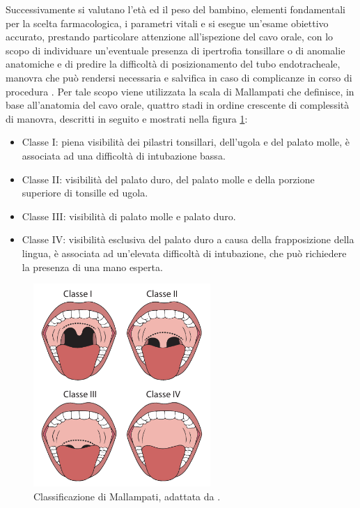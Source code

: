 Successivamente si valutano l'età ed il peso del bambino, elementi fondamentali per la scelta farmacologica, i parametri vitali e si esegue un'esame obiettivo accurato, prestando particolare attenzione all'ispezione del cavo orale, con lo scopo di individuare un'eventuale presenza di ipertrofia tonsillare o di anomalie anatomiche e di predire la difficoltà di posizionamento del tubo endotracheale, manovra che può rendersi necessaria e salvifica in caso di complicanze in corso di procedura \cite{Guidelines2019}. Per tale scopo viene utilizzata la scala di Mallampati che definisce, in base all'anatomia del cavo orale, quattro stadi in ordine crescente di complessità di manovra, descritti in seguito e mostrati nella figura \ref{fig:mallampati}:

\begin{itemize}
    \item Classe I: piena visibilità dei pilastri tonsillari, dell'ugola e del palato molle, è associata ad una difficoltà di intubazione bassa.
    \item Classe II: visibilità del palato duro, del palato molle e della porzione superiore di tonsille ed ugola.
    \item Classe III: visibilità di palato molle e palato duro.
    \item Classe IV: visibilità esclusiva del palato duro a causa della frapposizione della lingua, è associata ad un'elevata difficoltà di intubazione, che può richiedere la presenza di una mano esperta. 
\end{itemize}

\bigskip

\begin{figure}[h]
    \centering
    \includegraphics[width=0.6\textwidth]{Figure/mallampatpdf.pdf}
    \caption{Classificazione di Mallampati, adattata da \cite{Vargo2012}.}
    \label{fig:mallampati}
\end{figure}

